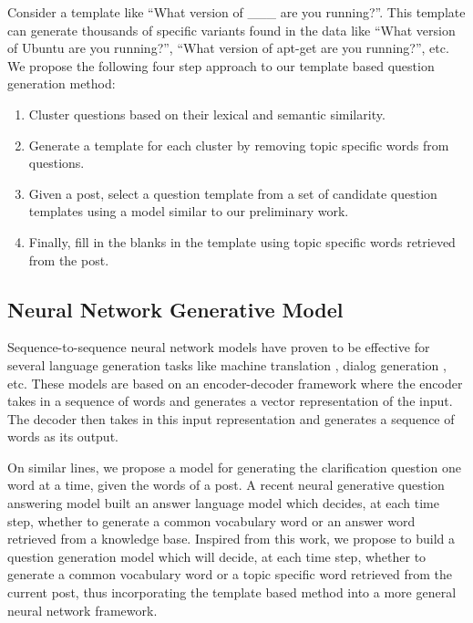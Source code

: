 \documentclass[11pt,a4paper]{article}
\begin{document}
 Consider a template like ``What version of \_\_\_  are you running?''. This template can generate thousands of specific variants found in the data like ``What version of Ubuntu are you running?'',  ``What version of apt-get are you running?'', etc. We propose the following four step approach to our template based question generation method:

\begin{enumerate} 
\item Cluster questions based on their lexical and semantic similarity. %
\item Generate a template for each cluster by removing topic specific words from questions.
\item Given a post, select a question template from a set of candidate question templates using a model similar to our preliminary work.
\item Finally, fill in the blanks in the template using topic specific words retrieved from the post. 
\end{enumerate}

\subsection{Neural Network Generative Model}
  
Sequence-to-sequence neural network models have proven to be effective for several language generation tasks like machine translation \cite{sutskever2014sequence}, dialog generation \cite{serban2016building}, etc. These models are based on an encoder-decoder framework where the encoder takes in a sequence of words and generates a vector representation of the input. The decoder then takes in this input representation and generates a sequence of words as its output. 

On similar lines, we propose a model for generating the clarification question one word at a time, given the words of a post. A recent neural generative question answering model \cite{yin2015neural} built an answer language model which decides, at each time step, whether to generate a common vocabulary word or an answer word retrieved from a knowledge base. %
Inspired from this work, we propose to build a question generation model which will decide, at each time step, whether to generate a common vocabulary word or a topic specific word retrieved from the current post, thus incorporating the template based method into a more general neural network framework.
\end{document}

